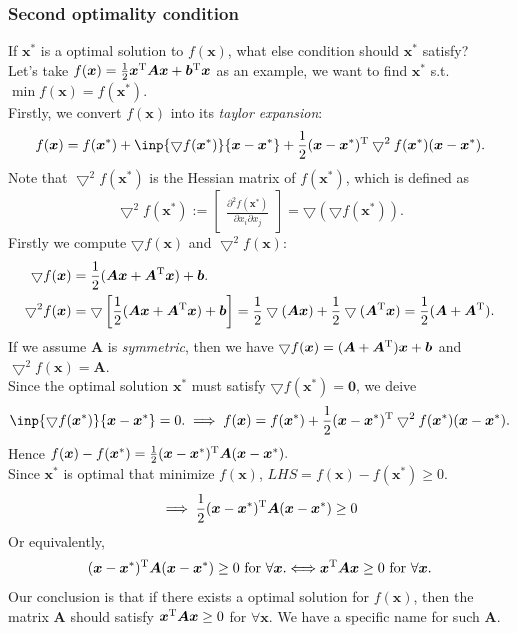 \subsubsection{Second optimality condition}
If $\bm x^{*}$ is a optimal solution to $f(\bm x)$, what else condition should $\bm x^{*}$ satisfy?\\ Let's take $f(\bm x)=\frac{1}{2}\bm x^{\mathrm T}\bm A\bm x+\bm b^{\mathrm T}\bm x$ as an example, we want to find $\bm x^{*}$ s.t. $\min f(\bm x)=f(\bm x^{*})$.\\
Firstly, we convert $f(\bm x)$ into its \textit{taylor expansion}:
\[
f(\bm x)=f(\bm x^{*})+\inp{\bigtriangledown f(\bm x^*)}{\bm x-\bm x^*}+\frac{1}{2}(\bm x-\bm x^*)\trans\bigtriangledown^2f(\bm x^*)(\bm x-\bm x^*).
\]
Note that $\bigtriangledown^2f(\bm x^*)$ is the Hessian matrix of $f(\bm x^*)$, which is defined as \[\bigtriangledown^2f(\bm x^*):=\begin{bmatrix}
\frac{\partial^2 f(\bm x^*)}{\partial x_{i}\partial x_{j}}
\end{bmatrix}=\bigtriangledown(\bigtriangledown f(\bm x^*)).\]
Firstly we compute $\bigtriangledown f(\bm x)$ and $\bigtriangledown^2 f(\bm x)$:
\begin{align*}
\bigtriangledown f(\bm x)&=\frac{1}{2}(\bm{Ax}+\bm A^{\mathrm T}\bm x)+\bm b.\\
\bigtriangledown^2 f(\bm x)&=\bigtriangledown\left[\frac{1}{2}(\bm{Ax}+\bm A^{\mathrm T}\bm x)+\bm b\right]=\frac{1}{2}\bigtriangledown(\bm{Ax})+\frac{1}{2}\bigtriangledown(\bm A^{\mathrm T}\bm x)
=\frac{1}{2}(\bm A+\bm A^{\mathrm T}).
\end{align*}
If we assume $\bm A$ is \emph{symmetric}, then we have $\bigtriangledown f(\bm x)=(\bm A+\bm A^{\mathrm T})\bm x+\bm b$ and $\bigtriangledown^2 f(\bm x)=\bm A$.\\
Since the optimal solution $\bm x^*$ must satisfy $\bigtriangledown f(\bm x^*)=\bm 0$, we deive \[\inp{\bigtriangledown f(\bm x^*)}{\bm x-\bm x^*}=0.
\implies
f(\bm x)=f(\bm x^{*})+\frac{1}{2}(\bm x-\bm x^*)\trans\bigtriangledown^2f(\bm x^*)(\bm x-\bm x^*).
\]
Hence $f(\bm x)-f(\bm x^{*})=\frac{1}{2}(\bm x-\bm x^*)^{\mathrm T}\bm A(\bm x-\bm x^*).$\\
Since $\bm x^*$ is optimal that minimize $f(\bm x)$, $LHS=f(\bm x)-f(\bm x^*)\ge0$.
\[
\implies 
\frac{1}{2}(\bm x-\bm x^*)^{\mathrm T}\bm A(\bm x-\bm x^*)\ge0
\]
Or equivalently,
\[
(\bm x-\bm x^*)^{\mathrm T}\bm A(\bm x-\bm x^*)\ge0\text{ for $\forall\bm x$.}
\Longleftrightarrow
\bm x^{\mathrm T}\bm A\bm x\ge0 \text{ for $\forall\bm x$.}
\]
Our conclusion is that if there exists a optimal solution for $f(\bm x)$, then the matrix $\bm A$ should satisfy $\bm x^{\mathrm T}\bm A\bm x\ge0$ for $\forall\bm x.$ We have a specific name for such $\bm A$.
